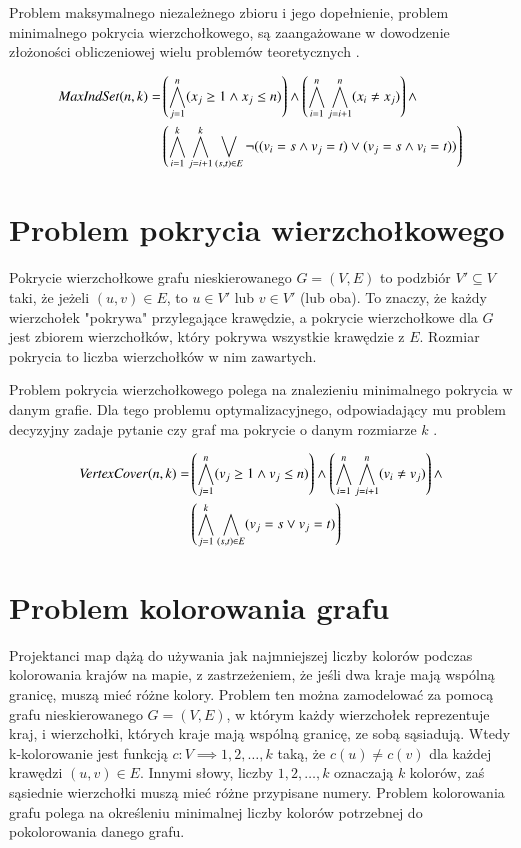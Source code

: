 Problem maksymalnego niezależnego zbioru i jego dopełnienie, problem minimalnego pokrycia wierzchołkowego, są zaangażowane w dowodzenie złożoności obliczeniowej wielu problemów teoretycznych \cite{Skiena20}.

\begin{align*}
	{\mathit{MaxIndSet}}(n, k) = &\left( \bigwedge_{j=1}^{n} (x_j \geq 1 \land x_j \leq n) \right) \land 
	\left( \bigwedge_{i=1}^{n} \bigwedge_{j=i+1}^{n} (x_i \neq x_j) \right) \land \\
	&\left( \bigwedge_{i=1}^{k} \bigwedge_{j=i+1}^{k} \bigvee_{(s,t) \in E} \lnot((v_i = s \land v_j = t) \lor (v_j = s \land v_i = t)) \right)	
\end{align*}


\section{Problem pokrycia wierzchołkowego}
Pokrycie wierzchołkowe grafu nieskierowanego $G = (V, E)$ to podzbiór $V' \subseteq V$ taki, że jeżeli $(u, v) \in E$, to $u \in V'$ lub $v \in V'$ (lub oba). To znaczy, że każdy wierzchołek "pokrywa" przylegające krawędzie, a pokrycie wierzchołkowe dla \(G\) jest zbiorem wierzchołków, który pokrywa wszystkie krawędzie z \(E\). Rozmiar pokrycia to liczba wierzchołków w nim zawartych.

Problem pokrycia wierzchołkowego polega na znalezieniu minimalnego pokrycia w danym grafie. Dla tego problemu optymalizacyjnego, odpowiadający mu problem decyzyjny zadaje pytanie czy graf ma pokrycie o danym rozmiarze \(k\) \cite{CormenLRS0023376}.

\begin{align*}
	{\mathit{VertexCover}}(n, k) = &\left( \bigwedge_{j=1}^{n} (v_j \geq 1 \land v_j \leq n) \right) \land 
	\left( \bigwedge_{i=1}^{n} \bigwedge_{j=i+1}^{n} (v_i \neq v_j) \right) \land \\
	&\left( \bigwedge_{j=1}^{k} \bigwedge_{(s,t) \in E} (v_j = s \lor v_j = t) \right)	
\end{align*}


\section{Problem kolorowania grafu}
Projektanci map dążą do używania jak najmniejszej liczby kolorów podczas kolorowania krajów na mapie, z zastrzeżeniem, że jeśli dwa kraje mają wspólną granicę, muszą mieć różne kolory. Problem ten można zamodelować za pomocą grafu nieskierowanego $G = (V, E)$, w którym każdy wierzchołek reprezentuje kraj, i wierzchołki, których kraje mają wspólną granicę, ze sobą sąsiadują. Wtedy k-kolorowanie jest funkcją $c : V \implies {1, 2, …, k}$ taką, że $c(u) \neq c(v)$ dla każdej krawędzi $(u, v) \in E$. Innymi słowy, liczby $1, 2, …, k$ oznaczają \(k\) kolorów, zaś sąsiednie wierzchołki muszą mieć różne przypisane numery. Problem kolorowania grafu polega na określeniu minimalnej liczby kolorów potrzebnej do pokolorowania danego grafu.

